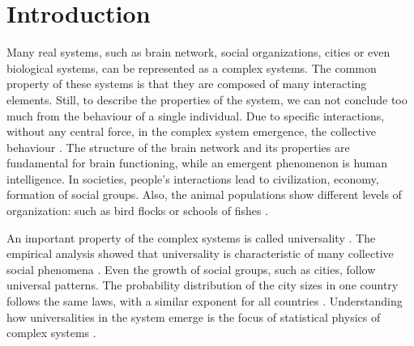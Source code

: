 \chapter{Introduction} %

Many real systems, such as brain network, social organizations, cities or even biological systems, can be represented as a complex systems. The common property of these systems is that they are composed of many interacting elements. Still, to describe the properties of the system, we can not conclude too much from the behaviour of a single individual. Due to specific interactions, without any central force, in the complex system emergence, the collective behaviour \cite{kwapien2012}. The structure of the brain network and its properties are fundamental for brain functioning, while an emergent phenomenon is human intelligence. In societies, people's interactions lead to civilization, economy, formation of social groups. Also, the animal populations show different levels of organization: such as bird flocks or schools of fishes \cite{thurner2018}.

An important property of the complex systems is called universality \cite{binney1992}. The empirical analysis showed that universality is characteristic of many collective social phenomena  \cite{chatterjee2013, radicchi2008}. Even the growth of social groups, such as cities, follow universal patterns. The probability distribution of the city sizes in one country follows the same laws, with a similar exponent for all countries \cite{barthelemy2019}. Understanding how universalities in the system emerge is the focus of statistical physics of complex systems \cite{verbavatz2020}. 


